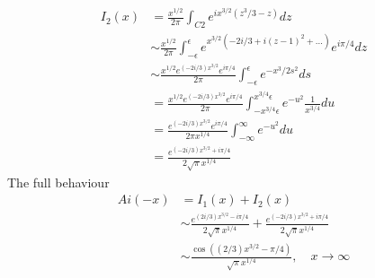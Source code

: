 \documentclass{X:/Documents/Coding/Latex/myassignment}
\begin{document}
\begin{align*}
    I_2(x) &= \frac{x^{1/2}}{2\pi}\int_{C2} e^{ix^{3/2}(z^3/3-z)} dz\\
    &\sim \frac{x^{1/2}}{2\pi}\int_{-\epsilon}^\epsilon e^{x^{3/2}(-2i/3 + i(z-1)^2 + \ldots)}e^{i\pi/4} dz\\
    &\sim \frac{x^{1/2}e^{(-2i/3)x^{3/2}} e^{i\pi/4}}{2\pi} \int_{-\epsilon}^\epsilon e^{-x^3/2 s^2} ds \\
    & = \frac{x^{1/2}e^{(-2i/3)x^{3/2}} e^{i\pi/4}}{2\pi} \int_{-x^{3/4}\epsilon}^{x^{3/4}\epsilon} e^{-u^2} \frac{1}{x^{3/4}}du \\
    & = \frac{e^{(-2i/3)x^{3/2}} e^{i\pi/4}}{2\pi x^{1/4}} \int_{-\infty}^{\infty} e^{-u^2} du \\
    & = \frac{e^{(-2i/3)x^{3/2}+i\pi/4}}{2\sqrt{\pi} x^{1/4}} 
\end{align*}
The full behaviour
\begin{align*}
    Ai(-x) &= I_1(x) + I_2(x)\\
    &\sim \frac{e^{(2i/3)x^{3/2}-i\pi/4}}{2\sqrt{\pi} x^{1/4}}  + \frac{e^{(-2i/3)x^{3/2}+i\pi/4}}{2\sqrt{\pi} x^{1/4}} \\
    &\sim \frac{\cos\left((2/3)x^{3/2} - \pi/4\right)}{\sqrt{\pi} x^{1/4}}, \quad x\to\infty
\end{align*}
\end{document}
